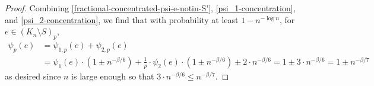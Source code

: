\documentclass[11pt]{article}
\numberwithin{equation}{section}
\newcounter{i}
\theoremstyle{plain}
\newtheorem{claim}{Claim}[thm]
\newenvironment{proofclaim}[1][]%
{\noindent \emph{Proof.} {}{#1}{}}{\hfill
	$\Diamond$\vspace{1em}}
\theoremstyle{plain} %
\theoremstyle{definition}
\newcommand{\cF}{\mathcal{F}}
\begin{document}
\begin{proof}
Combining \eqref{fractional-concentrated-psi-e-notin-S'}, \eqref{psi_1-concentration}, and \eqref{psi_2-concentration}, we find that with probability at least $1-n^{-\log n}$, for $e\in (K_n\setminus S)_p$,
\begin{align*}
    \psi_p(e) &= \psi_{1,p}(e)+\psi_{2,p}(e)\\
    &= \psi_{1}(e)\cdot \left(1\pm n^{-\beta/6}\right) + \frac{1}{p}\cdot \psi_{2}(e)\cdot \left(1\pm n^{-\beta/6}\right) \pm 2\cdot n^{-\beta/6} = 1\pm 3\cdot n^{-\beta/6}=1\pm n^{-\beta/7}
\end{align*}
as desired since $n$ is large enough so that $3\cdot n^{-\beta/6} \le n^{-\beta/7}$.

\end{proof}
\end{document}
